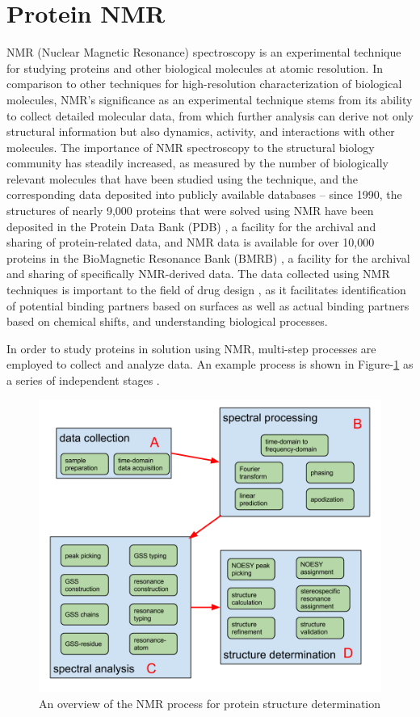\section{Protein NMR}
NMR (Nuclear Magnetic Resonance) spectroscopy is an experimental technique for 
studying proteins and other biological molecules at atomic resolution.  In 
comparison to other techniques for high-resolution characterization of 
biological molecules, NMR's significance as an experimental technique stems 
from its ability to collect detailed molecular data, from which further 
analysis can derive not only structural information but also dynamics, 
activity, and interactions with other molecules.  The importance of NMR 
spectroscopy to the structural biology community has steadily increased, as 
measured by the number of biologically relevant molecules that have been 
studied using the technique, and the corresponding data deposited into 
publicly available databases -- since 1990, the structures of nearly 9,000 
proteins that were solved using NMR have been deposited in the Protein Data 
Bank (PDB) \cite{pdb}, a facility for the archival and sharing of protein-related 
data, and NMR data is available for over 10,000 proteins in the BioMagnetic 
Resonance Bank (BMRB) \cite{bmrb}, a facility for the archival and sharing of 
specifically NMR-derived data.  The data collected using NMR techniques is 
important to the field of drug design 
\cite{stockman2002drugs, moore2003leveraging, reckel2011proteorhodopsin}, 
as it facilitates identification of potential 
binding partners based on surfaces as well as actual binding partners based on 
chemical shifts, and understanding biological processes.

In order to study proteins in solution using NMR, multi-step processes are 
employed to collect and analyze data.  An example process is shown in 
Figure-\ref{nmr_overview} as a series of independent stages 
\cite{guerry2011automated}.

\begin{figure}
  \includegraphics[scale=0.45]{figures/nmr_overview}
  \caption{An overview of the NMR process for protein structure determination}
  \label{nmr_overview}
\end{figure}

